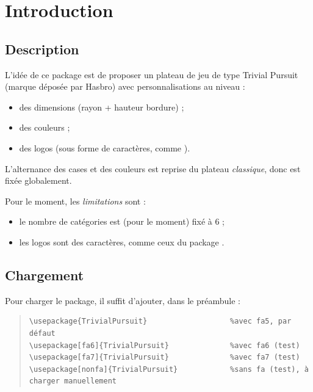 \documentclass[11pt,a4paper]{ltxdoc}
\begin{document}
\vspace*{5mm}

\section{Introduction}

\subsection{Description}

L'idée de ce package est de proposer un plateau de jeu de type \textsf{Trivial Pursuit} (marque déposée par Hasbro) avec personnalisations au niveau :

\begin{itemize}
	\item des dimensions (rayon + hauteur bordure) ;
	\item des couleurs ;
	\item des logos (sous forme de caractères, comme ).
\end{itemize}

L'alternance des cases et des couleurs est reprise du plateau \textit{classique}, donc est fixée globalement.

\medskip

Pour le moment, les \textit{limitations} sont :

\begin{itemize}
	\item le nombre de catégories est (pour le moment) fixé à 6 ;
	\item les logos sont des caractères, comme ceux du package .
\end{itemize}

\subsection{Chargement}

Pour charger le package, il suffit d'ajouter, dans le préambule :

\begin{quote}
\begin{verbatim}
\usepackage{TrivialPursuit}                   %avec fa5, par défaut
\usepackage[fa6]{TrivialPursuit}              %avec fa6 (test)
\usepackage[fa7]{TrivialPursuit}              %avec fa7 (test)
\usepackage[nonfa]{TrivialPursuit}            %sans fa (test), à charger manuellement
\end{verbatim}
\end{quote}
\end{document}
